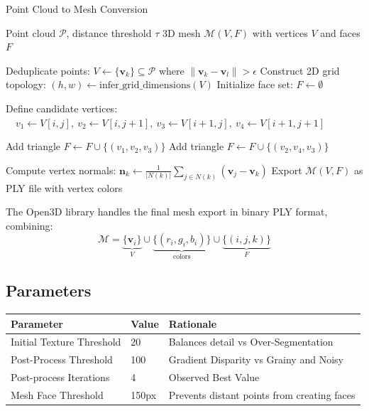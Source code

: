 \documentclass{article}
\begin{document}
\medskip
\begin{algorithm}[H]
\caption{Point Cloud to Mesh Conversion}
\begin{algorithmic}[1]
\Require{} Point cloud $\mathcal{P}$, distance threshold $\tau$
\Ensure{} 3D mesh $\mathcal{M}(V,F)$ with vertices $V$ and faces $F$

\State{} Deduplicate points: $V \gets \{\mathbf{v}_k\} \subseteq \mathcal{P}$ where $\|\mathbf{v}_k - \mathbf{v}_l\| > \epsilon$
\State{} Construct 2D grid topology: $(h,w) \gets \text{infer\_grid\_dimensions}(V)$
\State{} Initialize face set: $F \gets \emptyset$

    \State{} Define candidate vertices:
    \State{} $\quad v_1 \gets V[i,j],\ v_2 \gets V[i,j+1],\ v_3 \gets V[i+1,j],\ v_4 \gets V[i+1,j+1]$
    
        \State{} Add triangle $F \gets F \cup \{(v_1,v_2,v_3)\}$
        \State{} Add triangle $F \gets F \cup \{(v_2,v_4,v_3)\}$
    \EndIf{}
\EndFor{}

\State{} Compute vertex normals: $\mathbf{n}_k \gets \frac{1}{|N(k)|}\sum_{j\in N(k)}(\mathbf{v}_j - \mathbf{v}_k)$
\State{} Export $\mathcal{M}(V,F)$ as PLY file with vertex colors
\end{algorithmic}
\end{algorithm}


The Open3D library handles the final mesh export in binary PLY format, combining:
\begin{equation}
    \mathcal{M} = \underbrace{\{\mathbf{v}_i\}}_{V} \cup \underbrace{\{(r_i,g_i,b_i)\}}_{\text{colors}} \cup \underbrace{\{(i,j,k)\}}_{F}
\end{equation}
\vspace{1cm}
\subsection{Parameters}
\vspace{1cm}
\begin{table}[h]
\centering
\begin{tabular}{|l|l|l|}
\hline
\textbf{Parameter} & \textbf{Value} & \textbf{Rationale} \\ \hline
Initial Texture Threshold & 20 & Balances detail vs Over-Segmentation \\ \hline
Post-Process Threshold & 100 & Gradient Disparity vs Grainy and Noisy \\ \hline
Post-process Iterations & 4 & Observed Best Value \\ \hline
Mesh Face Threshold & 150px & Prevents distant points from creating faces \\ \hline
\end{tabular}
\end{table}
\end{document}
